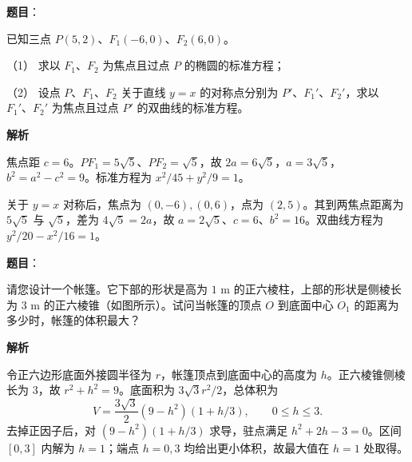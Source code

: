 \begin{answer}

\textbf{题目}：

已知三点 $P(5,2)\text{、}F_1(-6,0)\text{、}F_2(6,0)$。

（1） 求以 $F_1\text{、}F_2$ 为焦点且过点 $P$ 的椭圆的标准方程；

（2） 设点 $P\text{、}F_1\text{、}F_2$ 关于直线 $y=x$ 的对称点分别为 $P'\text{、}F_1'\text{、}F_2'$，求以 $F_1'\text{、}F_2'$ 为焦点且过点 $P'$ 的双曲线的标准方程。

\textbf{解析}


焦点距 $c=6$。$PF_1=5\sqrt5$、$PF_2=\sqrt5$，故 $2a=6\sqrt5$，$a=3\sqrt5$，$b^2=a^2-c^2=9$。标准方程为 $x^2/45+y^2/9=1$。


关于 $y=x$ 对称后，焦点为 $(0,-6),(0,6)$，点为 $(2,5)$。其到两焦点距离为 $5\sqrt5$ 与 $\sqrt5$，差为 $4\sqrt5=2a$，故 $a=2\sqrt5$、$c=6$、$b^2=16$。双曲线方程为 $y^2/20-x^2/16=1$。



\end{answer}
\begin{answer}

\textbf{题目}：

请您设计一个帐篷。它下部的形状是高为 $1\text{ m}$ 的正六棱柱，上部的形状是侧棱长为 $3\text{ m}$ 的正六棱锥（如图所示）。试问当帐篷的顶点 $O$ 到底面中心 $O_1$ 的距离为多少时，帐篷的体积最大？
\nopagebreak[4]
\begin{center}\end{center}
\nopagebreak[4]
\textbf{解析}

令正六边形底面外接圆半径为 $r$，帐篷顶点到底面中心的高度为 $h$。正六棱锥侧棱长为 3，故 $r^2+h^2=9$。底面积为 $3\sqrt3r^2/2$，总体积为
\nopagebreak[4]
\[
V=\frac{3\sqrt3}{2}(9-h^2)(1+h/3),\qquad 0\le h\le3.
\]
去掉正因子后，对 $(9-h^2)(1+h/3)$ 求导，驻点满足 $h^2+2h-3=0$。区间 $[0,3]$ 内解为 $h=1$；端点 $h=0,3$ 均给出更小体积，故最大值在 $h=1$ 处取得。


\end{answer}
